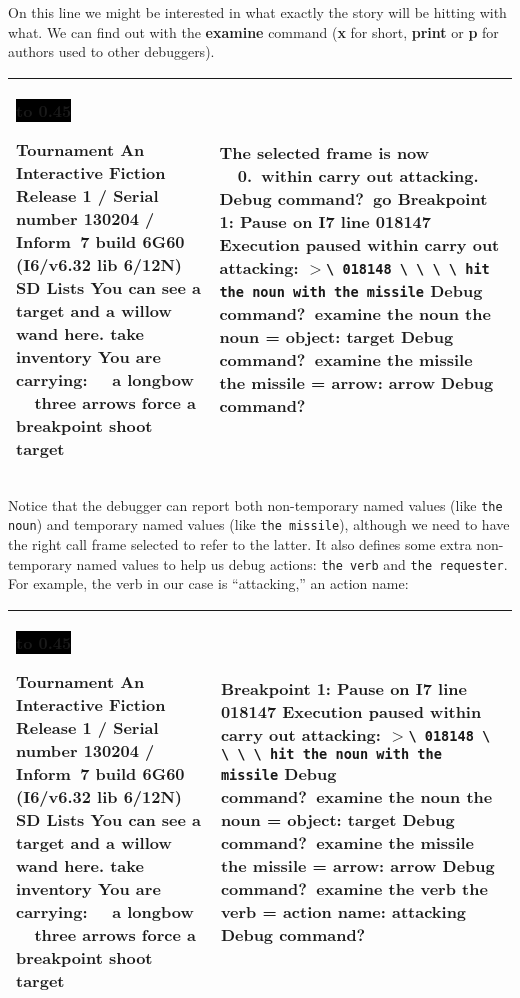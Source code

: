 \documentclass{book}
\newcommand{\n}{\hspace*{\fill}\newline}
\newcommand{\terp}[2]{\begin{center}\begin{tabular}{p{0.45\textwidth}|p{0.45\textwidth}}\midrule #1&#2\\\midrule\end{tabular}\end{center}}
\newcommand{\glkheading}[1]{\textbf{#1}}
\newcommand{\glkinput}[1]{\textbf{#1}}
\newcommand{\glkstatusline}[2]{\centerline{\colorbox{black}{\hbox to 0.45\textwidth{\textcolor{white}{#1\hfil #2}}}}}
\newcommand{\storyprompt}{\raisebox{1.5pt}{\(>\)}}
\newcommand{\cursor}{\raisebox{-1.5pt}{\RectangleThin}}
\newcommand{\markedindent}{\(>\)}
\begin{document}
On this line we might be interested in what exactly the story will be hitting
with what.  We can find out with the \glkinput{examine} command (\glkinput{x}
for short, \glkinput{print} or \glkinput{p} for authors used to other
debuggers).

\terp{\glkstatusline{Lists}{0/2}\n
  \glkheading{Tournament}\n
  An Interactive Fiction\n
  Release 1 / Serial number 130204 / Inform~7 build 6G60 (I6/v6.32 lib 6/12N) SD\n
  \n
  \glkheading{Lists}\n
  You can see a target and a willow wand here.\n
  \n
  \storyprompt\glkinput{take inventory}\n
  You are carrying:\n
  \null\ \ a longbow\n
  \null\ \ three arrows\n
  \n
  \storyprompt\glkinput{force a breakpoint}\n
  \storyprompt\glkinput{shoot target}}{%
  The selected frame is now\n
  \null\ \ 0.\ within carry out attacking.\n
  \n
  Debug command?\ \glkinput{go}\n
  \n
  \glkheading{Breakpoint 1:} Pause on I7 line 018147\n
  \n
  Execution paused within carry out attacking:\n
  \markedindent \lstinline{\ 018148 \ \ \ \ hit the noun with the missile}\n
  \n
  Debug command?\ \glkinput{examine the noun}\n
  \n
  the noun = object: target\n
  \n
  Debug command?\ \glkinput{examine the missile}\n
  \n
  the missile = arrow: arrow\n
  \n
  Debug command?\ \cursor}

Notice that the debugger can report both non-temporary named values (like
\lstinline{the noun}) and temporary named values (like \lstinline{the missile}),
although we need to have the right call frame selected to refer to the latter.
It also defines some extra non-temporary named values to help us debug actions:
\lstinline{the verb} and \lstinline{the requester}.  For example, the verb in
our case is ``attacking,'' an action name:

\terp{\glkstatusline{Lists}{0/2}\n
  \glkheading{Tournament}\n
  An Interactive Fiction\n
  Release 1 / Serial number 130204 / Inform~7 build 6G60 (I6/v6.32 lib 6/12N) SD\n
  \n
  \glkheading{Lists}\n
  You can see a target and a willow wand here.\n
  \n
  \storyprompt\glkinput{take inventory}\n
  You are carrying:\n
  \null\ \ a longbow\n
  \null\ \ three arrows\n
  \n
  \storyprompt\glkinput{force a breakpoint}\n
  \storyprompt\glkinput{shoot target}}{%
  \glkheading{Breakpoint 1:} Pause on I7 line 018147\n
  \n
  Execution paused within carry out attacking:\n
  \markedindent \lstinline{\ 018148 \ \ \ \ hit the noun with the missile}\n
  \n
  Debug command?\ \glkinput{examine the noun}\n
  \n
  the noun = object: target\n
  \n
  Debug command?\ \glkinput{examine the missile}\n
  \n
  the missile = arrow: arrow\n
  \n
  Debug command?\ \glkinput{examine the verb}\n
  \n
  the verb = action name: attacking\n
  \n
  Debug command?\ \cursor}
\end{document}
